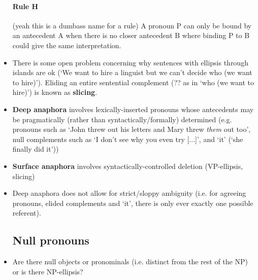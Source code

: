\documentclass{article}
\begin{document}
\begin{itemize}
    \paragraph{Rule H} (yeah this is a dumbass name for a rule) A pronoun P can only be bound by an antecedent A when there is no closer antecedent B where binding P to B could give the same interpretation.
    \item There is some open problem concerning why sentences with ellipsis through islands are ok (`We want to hire a linguist but we can't decide who (we want to hire)'). Eliding an entire sentential complement (?? as in `who (we want to hire)') is known as \textbf{slicing}.
    \item \textbf{Deep anaphora} involves lexically-inserted pronouns whose antecedents may be pragmatically (rather than syntactically/formally) determined  (e.g. pronouns such as `John threw out his letters and Mary threw \textit{them} out too', null complements such as `I don't see why you even try [...]', and `it' (`she finally did it'))  
    \item \textbf{Surface anaphora} involves syntactically-controlled deletion (VP-ellipsis, slicing)
    \item Deep anaphora does not allow for strict/sloppy ambiguity (i.e. for agreeing pronouns, elided complements and `it', there is only ever exactly one possible referent).
    \subsection{Null pronouns}
    \item Are there null objects or pronominals (i.e. distinct from the rest of the NP) or is there NP-ellipsis?

\end{itemize}
\end{document}
